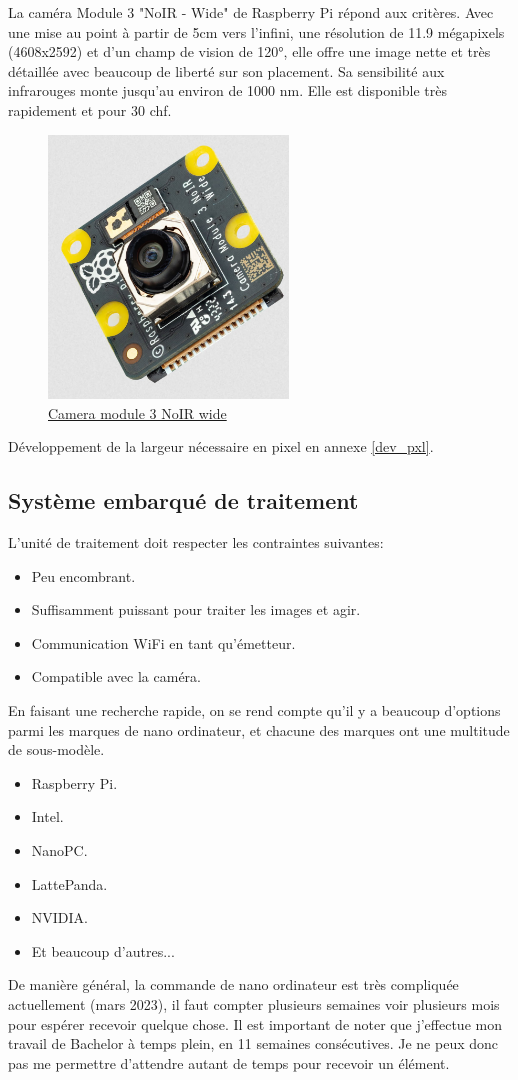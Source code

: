 La caméra Module 3 "NoIR - Wide" de Raspberry Pi \cite{camera} répond aux critères. Avec une mise au point à partir de 5cm vers l'infini,
une résolution de 11.9 mégapixels (4608x2592) et d'un champ de vision de \ang{120}, elle offre une image nette et très détaillée avec beaucoup de liberté sur
son placement. Sa sensibilité aux infrarouges monte jusqu'au environ de 1000 \si{\nano\metre}. Elle est disponible très rapidement et pour 30 \gls{chf}.
\begin{figure}[H]
    \centering
    \includegraphics[height=7cm,angle=-90]{assets/figures/camera.png}
    \caption{\href{https://www.digikey.ch/en/products/detail/raspberry-pi/SC0875/17278642}{Camera module 3 NoIR wide}}
\end{figure}
Développement de la largeur nécessaire en pixel en annexe \ref{dev_pxl}.
\newpage
\subsection{Système embarqué de traitement}
L'unité de traitement doit respecter les contraintes suivantes:
\begin{itemize}
    \item Peu encombrant.
    \item Suffisamment puissant pour traiter les images et agir.
    \item Communication WiFi en tant qu'émetteur.
    \item Compatible avec la caméra.
\end{itemize}
En faisant une recherche rapide, on se rend compte qu'il y a beaucoup d'options parmi les marques de nano ordinateur,
et chacune des marques ont une multitude de sous-modèle.
\begin{itemize}
    \item Raspberry Pi.
    \item Intel.
    \item NanoPC.
    \item LattePanda.
    \item NVIDIA.
    \item Et beaucoup d'autres...
\end{itemize}
De manière général, la commande de nano ordinateur est très compliquée actuellement (mars 2023), il faut compter plusieurs semaines voir plusieurs mois
pour espérer recevoir quelque chose. Il est important de noter que j'effectue mon travail de Bachelor à temps plein, en 11 semaines consécutives.
Je ne peux donc pas me permettre d'attendre autant de temps pour recevoir un élément.

